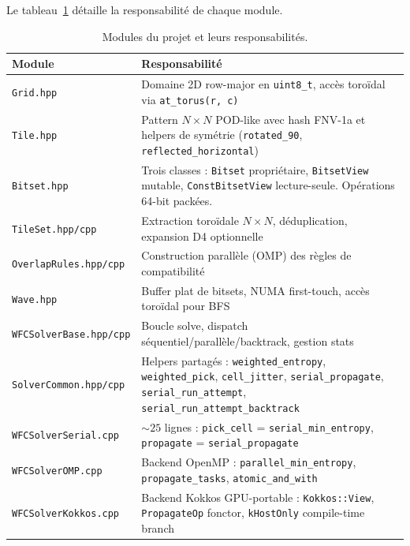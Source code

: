Le tableau~\ref{tab:modules} détaille la responsabilité de chaque module.

\begin{table}[H]
\centering
\begin{tabularx}{\textwidth}{lX}
\toprule
\textbf{Module} & \textbf{Responsabilité} \\
\midrule
\texttt{Grid.hpp} & Domaine 2D row-major en \texttt{uint8\_t}, accès toroïdal via \texttt{at\_torus(r, c)} \\
\midrule
\texttt{Tile.hpp} & Pattern $N \times N$ POD-like avec hash FNV-1a et helpers de symétrie (\texttt{rotated\_90}, \texttt{reflected\_horizontal}) \\
\midrule
\texttt{Bitset.hpp} & Trois classes : \texttt{Bitset} propriétaire, \texttt{BitsetView} mutable, \texttt{ConstBitsetView} lecture-seule. Opérations 64-bit packées. \\
\midrule
\texttt{TileSet.hpp/cpp} & Extraction toroïdale $N \times N$, déduplication, expansion D4 optionnelle \\
\midrule
\texttt{OverlapRules.hpp/cpp} & Construction parallèle (OMP) des règles de compatibilité \\
\midrule
\texttt{Wave.hpp} & Buffer plat de bitsets, NUMA first-touch, accès toroïdal pour BFS \\
\midrule
\texttt{WFCSolverBase.hpp/cpp} & Boucle solve, dispatch séquentiel/parallèle/backtrack, gestion stats \\
\midrule
\texttt{SolverCommon.hpp/cpp} & Helpers partagés : \texttt{weighted\_entropy}, \texttt{weighted\_pick}, \texttt{cell\_jitter}, \texttt{serial\_propagate}, \texttt{serial\_run\_attempt}, \texttt{serial\_run\_attempt\_backtrack} \\
\midrule
\texttt{WFCSolverSerial.cpp} & $\sim 25$ lignes : \texttt{pick\_cell} = \texttt{serial\_min\_entropy}, \texttt{propagate} = \texttt{serial\_propagate} \\
\midrule
\texttt{WFCSolverOMP.cpp} & Backend OpenMP : \texttt{parallel\_min\_entropy}, \texttt{propagate\_tasks}, \texttt{atomic\_and\_with} \\
\midrule
\texttt{WFCSolverKokkos.cpp} & Backend Kokkos GPU-portable : \texttt{Kokkos::View}, \texttt{PropagateOp} fonctor, \texttt{kHostOnly} compile-time branch \\
\bottomrule
\end{tabularx}
\caption{Modules du projet et leurs responsabilités.}
\label{tab:modules}
\end{table}

